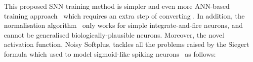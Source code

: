 This proposed SNN training method is simpler and even more \DIFdelbegin {}\DIFdelend \DIFaddbegin {}\DIFaddend ANN-based training approach~\citep{cao2015spiking,diehl2015fast} which requires an extra step of converting \DIFdelbegin {}\DIFdelend \DIFaddbegin {}\DIFaddend .
In addition, the normalisation algorithm~\citep{diehl2015fast} \DIFdelbegin {}\DIFdelend \DIFaddbegin {}\DIFaddend only works for simple integrate-and-fire neurons, and cannot be generalised \DIFdelbegin {}\DIFdelend \DIFaddbegin {}\DIFaddend biologically-plausible neurons.
Moreover, the novel activation function, Noisy Softplus, tackles all \DIFaddbegin {}\DIFaddend the problems raised by the Siegert formula which \DIFaddbegin {}\DIFaddend used to model sigmoid-like spiking neurons~\citep{Jug_etal_2012} as follows: 
